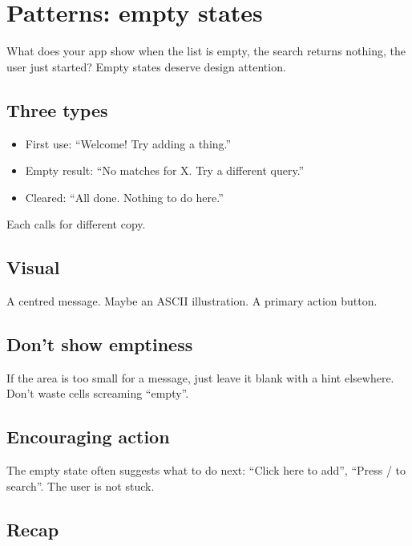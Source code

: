 \chapter{Patterns: empty states}
\label{ch:empty}

\begin{aside}
What does your app show when the list is empty, the search
returns nothing, the user just started? Empty states deserve
design attention.
\end{aside}

\section{Three types}

\begin{itemize}[leftmargin=*]
  \item First use: ``Welcome! Try adding a thing.''
  \item Empty result: ``No matches for X. Try a different
    query.''
  \item Cleared: ``All done. Nothing to do here.''
\end{itemize}

Each calls for different copy.

\section{Visual}

A centred message. Maybe an ASCII illustration. A primary
action button.

\section{Don't show emptiness}

If the area is too small for a message, just leave it
blank with a hint elsewhere. Don't waste cells screaming
``empty''.

\section{Encouraging action}

The empty state often suggests what to do next: ``Click
here to add'', ``Press / to search''. The user is not
stuck.

\section{Recap}

